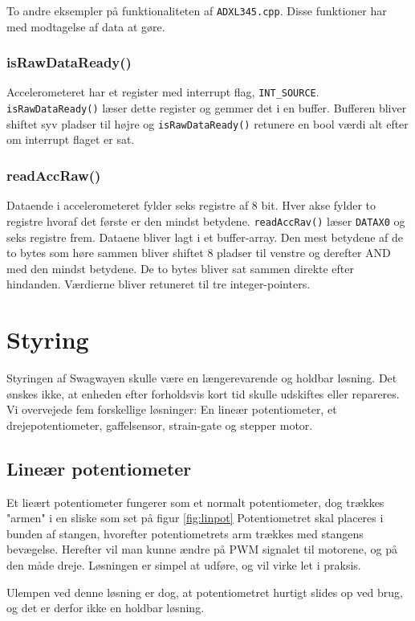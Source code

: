 \documentclass[a4paper,oneside,article,danish,table]{memoir}
\newcommand{\adxlc}[2]{}
\begin{document}
To andre eksempler på funktionaliteten af \texttt{ADXL345.cpp}. Disse funktioner har med modtagelse af data at gøre.

\subsubsection{isRawDataReady()}
\adxlc{75}{79}
Accelerometeret har et register med interrupt flag, \lstinline{INT_SOURCE}. \lstinline{isRawDataReady()} læser dette register og gemmer det i en buffer. Bufferen bliver shiftet syv pladser til højre og  \lstinline{isRawDataReady()} retunere en bool værdi alt efter om interrupt flaget er sat.

\subsubsection{readAccRaw()}
\adxlc{99}{105}
Dataende i accelerometeret fylder seks registre af 8 bit. Hver akse fylder to registre hvoraf det første er den mindst betydene. \lstinline{readAccRav()} læser \lstinline{DATAX0} og seks registre frem. Dataene bliver lagt i et buffer-array. Den mest betydene af de to bytes som høre sammen bliver shiftet 8 pladser til venstre og derefter AND med den mindst betydene. De to bytes bliver sat sammen direkte efter hindanden. Værdierne bliver retuneret til tre integer-pointers.

\section{Styring}
Styringen af Swagwayen skulle være en længerevarende og holdbar løsning. Det ønskes ikke, at enheden efter forholdsvis kort tid skulle udskiftes eller repareres. Vi overvejede fem forskellige løsninger: En lineær potentiometer, et drejepotentiometer, gaffelsensor, strain-gate og stepper motor.
\subsection{Lineær potentiometer} 
Et lieært potentiometer fungerer som et normalt potentiometer, dog trækkes "armen" i en sliske som set på figur \ref{fig:linpot}
Potentiometret skal placeres i bunden af stangen, hvorefter potentiometrets arm trækkes med stangens bevægelse. Herefter vil man kunne ændre på PWM signalet til motorene, og på den måde dreje. Løsningen er simpel at udføre, og vil virke let i praksis.

Ulempen ved denne løsning er dog, at potentiometret hurtigt slides op ved brug, og det er derfor ikke en holdbar løsning. 
\end{document}
